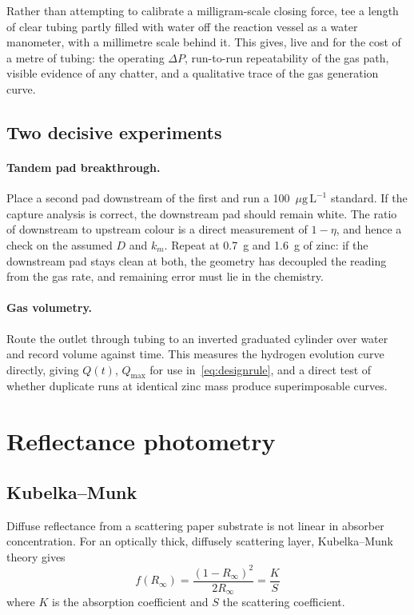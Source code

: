 \documentclass[11pt,a4paper]{article}
\newcommand{\ptl}{\ensuremath{\mu\mathrm{g\,L^{-1}}}}
\begin{document}
Rather than attempting to calibrate a milligram-scale closing force, tee a
length of clear tubing partly filled with water off the reaction vessel as a
water manometer, with a millimetre scale behind it. This gives, live and for
the cost of a metre of tubing: the operating $\Delta P$, run-to-run
repeatability of the gas path, visible evidence of any chatter, and a
qualitative trace of the gas generation curve.

\subsection{Two decisive experiments}

\paragraph{Tandem pad breakthrough.} Place a second pad downstream of the
first and run a 100~\ptl{} standard. If the capture analysis is correct,
the downstream pad should remain white. The ratio of downstream to upstream
colour is a direct measurement of $1 - \eta$, and hence a check on the
assumed $D$ and $k_m$. Repeat at 0.7~g and 1.6~g of zinc: if the downstream
pad stays clean at both, the geometry has decoupled the reading from the gas
rate, and remaining error must lie in the chemistry.

\paragraph{Gas volumetry.} Route the outlet through tubing to an inverted
graduated cylinder over water and record volume against time. This measures
the hydrogen evolution curve directly, giving $Q(t)$, $Q_{\max}$ for use
in~\eqref{eq:designrule}, and a direct test of whether duplicate runs at
identical zinc mass produce superimposable curves.

\section{Reflectance photometry}
\label{sec:optics}

\subsection{Kubelka--Munk}

Diffuse reflectance from a scattering paper substrate is not linear in
absorber concentration. For an optically thick, diffusely scattering layer,
Kubelka--Munk theory gives
\begin{equation}
  \boxed{\;
  f(R_\infty) = \frac{(1 - R_\infty)^2}{2R_\infty}
  = \frac{K}{S}\;}
  \label{eq:km}
\end{equation}
where $K$ is the absorption coefficient and $S$ the scattering coefficient.
\end{document}
